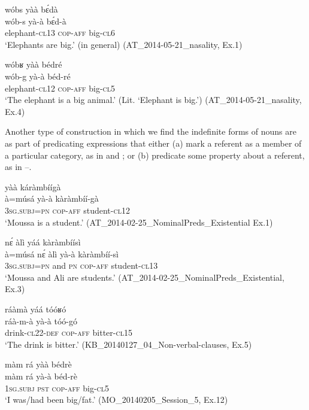 \documentclass[output=paper]{langsci/langscibook}
\begin{document}
\ea\label{ex:teo:32}
\glll wóbs yàà b\'ɛdà\\
 wób-s yà-à b\'ɛd-à\\
 elephant-\textsc{cl13} \textsc{cop-aff} big-\textsc{cl6}\\
\glt ‘Elephants are big.’ (in general) (AT\_2014-05-21\_nasality, Ex.1)
\z

\ea\label{ex:teo:33}
\glll wóbʁ yàà bédré\\
 wób-g yà-à béd-ré\\
elephant-\textsc{cl12} \textsc{cop-aff} big-\textsc{cl5}\\
\glt ‘The elephant is a big animal.’ (Lit. ‘Elephant is big.’) (AT\_2014-05-21\_nasality, Ex.4)
\z

Another type of construction in which we find the indefinite forms of nouns are as part of predicating expressions that either (a) mark a referent as a member of a particular category, as in  and ; or (b) predicate some property about a referent, as in –.

\ea\label{ex:teo:34}
 yàà káràmbíígà\\
  à=músá yà-à kàràmbíí-gà\\
 \textsc{3sg.subj=pn} \textsc{cop-aff} student-\textsc{cl12}\\
\glt ‘Moussa is a student.’ (AT\_2014-02-25\_NominalPreds\_Existential Ex.1)
\z

\ea\label{ex:teo:35}
 n\'ɛ àlì yáá kàràmbíísì\\
 à=músá n\'ɛ àlì yà-à kàràmbíí-sì\\
\textsc{3sg.subj=pn} and \textsc{pn}  \textsc{cop-aff} student-\textsc{cl}13\\
\glt ‘Moussa and Ali are students.’ (AT\_2014-02-25\_NominalPreds\_Existential, Ex.3)
\z

\ea\label{ex:teo:36}
\glll ráàmà yáá tóóʁó\\
 ráà-m-à yà-à tóó-gó\\
drink-\textsc{cl22-def} \textsc{cop-aff} bitter-\textsc{cl15}\\
\glt ‘The drink is bitter.’ (KB\_20140127\_04\_Non-verbal-clauses, Ex.5)
\z

\ea\label{ex:teo:37}
\glll màm rá yàà bédrè\\
 màm rá yà-à béd-rè\\
\textsc{1sg.subj} \textsc{pst} \textsc{cop-aff} big-\textsc{cl5}\\
\glt ‘I was/had been big/fat.’ (MO\_20140205\_Session\_5, Ex.12)
\z
\end{document}
